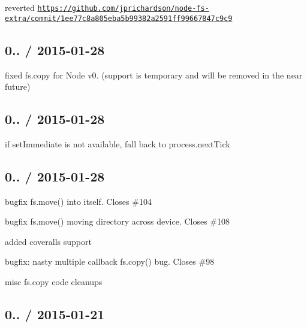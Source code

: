\begin{DoxyItemize}
\item reverted \href{https://github.com/jprichardson/node-fs-extra/commit/1ee77c8a805eba5b99382a2591ff99667847c9c9}{\tt https\+://github.\+com/jprichardson/node-\/fs-\/extra/commit/1ee77c8a805eba5b99382a2591ff99667847c9c9}
\end{DoxyItemize}

\subsection*{0.. / 2015-\/01-\/28 }


\begin{DoxyItemize}
\item fixed {\ttfamily fs.\+copy} for Node v0. (support is temporary and will be removed in the near future)
\end{DoxyItemize}

\subsection*{0.. / 2015-\/01-\/28 }


\begin{DoxyItemize}
\item if {\ttfamily set\+Immediate} is not available, fall back to {\ttfamily process.\+next\+Tick}
\end{DoxyItemize}

\subsection*{0.. / 2015-\/01-\/28 }


\begin{DoxyItemize}
\item bugfix {\ttfamily fs.\+move()} into itself. Closes \#104
\item bugfix {\ttfamily fs.\+move()} moving directory across device. Closes \#108
\item added coveralls support
\item bugfix\+: nasty multiple callback {\ttfamily fs.\+copy()} bug. Closes \#98
\item misc fs.\+copy code cleanups
\end{DoxyItemize}

\subsection*{0.. / 2015-\/01-\/21 }


